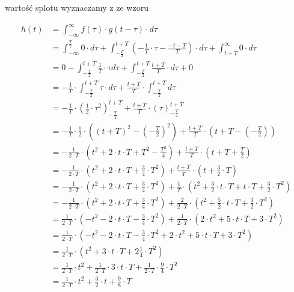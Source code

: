 \begin{task}
wartość splotu wyznaczamy z ze wzoru

\begin{align*}
h(t)&=\int_{-\infty}^{\infty} f(\tau) \cdot g(t-\tau) \cdot d\tau\\
&=\int_{-\infty}^{\frac{T}{2}} 0 \cdot d\tau + \int_{-\frac{T}{2}}^{t+T}\left( -\frac{1}{T}\cdot \tau - \frac{-t-T}{T} \right)\cdot d\tau +\int_{t+T}^{\infty} 0 \cdot d\tau\\
&=0 - \int_{-\frac{T}{2}}^{t+T} \frac{1}{T}\cdot \tau d\tau + \int_{-\frac{T}{2}}^{t+T} \frac{t+T}{T} \cdot d\tau +0\\
&=- \frac{1}{T}\cdot \int_{-\frac{T}{2}}^{t+T} \tau \cdot d\tau + \frac{t+T}{T} \cdot \int_{-\frac{T}{2}}^{t+T} d\tau\\
&=- \frac{1}{T}\cdot \left( \frac{1}{2} \cdot \tau^2 \right)_{-\frac{T}{2}}^{t+T} + \frac{t+T}{T} \cdot \left(\tau \right)_{-\frac{T}{2}}^{t+T}\\
&=- \frac{1}{T}\cdot \frac{1}{2} \cdot \left(  \left(t+T\right)^2 -\left(-\frac{T}{2}\right)^2 \right) + \frac{t+T}{T} \cdot \left(t+T - \left(-\frac{T}{2}\right) \right)\\
&=- \frac{1}{2\cdot T} \cdot \left(  t^2+2\cdot t\cdot T + T^2 -\frac{T^2}{4} \right) + \frac{t+T}{T} \cdot \left(t+T + \frac{T}{2} \right)\\
&=- \frac{1}{2\cdot T} \cdot \left(  t^2+2\cdot t\cdot T + \frac{3}{4}\cdot T^2 \right) + \frac{t+T}{T} \cdot \left(t+\frac{3}{2}\cdot T\right)\\
&=- \frac{1}{2\cdot T} \cdot \left(  t^2+2\cdot t\cdot T + \frac{3}{4}\cdot T^2 \right) + \frac{1}{T} \cdot \left(t^2 + \frac{3}{2} \cdot t \cdot T + t\cdot T +\frac{3}{2}\cdot T^2\right)\\
&=- \frac{1}{2\cdot T} \cdot \left(  t^2+2\cdot t\cdot T + \frac{3}{4}\cdot T^2 \right) + \frac{2}{2\cdot T} \cdot \left(t^2 + \frac{5}{2} \cdot t \cdot T+\frac{3}{2}\cdot T^2\right)\\
&=\frac{1}{2\cdot T} \cdot \left(  -t^2-2\cdot t\cdot T - \frac{3}{4}\cdot T^2 \right) + \frac{1}{2\cdot T} \cdot \left(2\cdot t^2 + 5 \cdot t \cdot T+3\cdot T^2\right)\\
&=\frac{1}{2\cdot T} \cdot \left(  -t^2-2\cdot t\cdot T - \frac{3}{4}\cdot T^2 + 2\cdot t^2 + 5 \cdot t \cdot T+3\cdot T^2\right)\\
&=\frac{1}{2\cdot T} \cdot \left( t^2 + 3 \cdot t \cdot T+2 \frac{1}{4} \cdot  T^2\right)\\
&=\frac{1}{2\cdot T} \cdot t^2 + \frac{1}{2 \cdot T} \cdot 3 \cdot t \cdot T+\frac{1}{2\cdot T} \cdot \frac{9}{4} \cdot  T^2\\
&=\frac{1}{2\cdot T} \cdot t^2 + \frac{3}{2} \cdot t+\frac{9}{8} \cdot  T\\
\end{align*}


\end{task}
